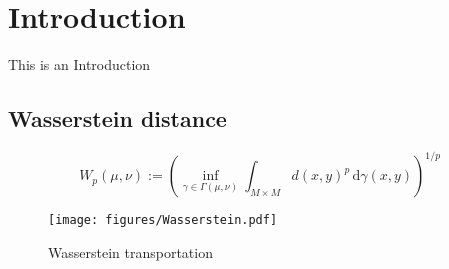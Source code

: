 \section{Introduction} %
\label{sec:Introduction}
This is an Introduction
\subsection{Wasserstein distance} %
\label{sub:Wasserstein distance}
    \begin{equation}
        W_{p}(\mu ,\nu ):=\left(\inf _{\gamma \in \Gamma (\mu ,\nu )}\int _{M\times M}d(x,y)^{p}\,\mathrm {d} \gamma (x,y)\right)^{1/p}
        \label{eq:w-dist-def}
    \end{equation}
    \begin{figure}[H]
        \centering
            \texttt{[image: figures/Wasserstein.pdf]}
        \caption{Wasserstein transportation}
        \label{fig:Wasserstein transportation}
    \end{figure}
